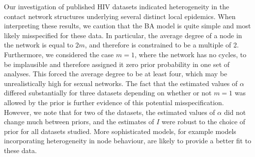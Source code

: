 Our investigation of published HIV datasets indicated heterogeneity in the
contact network structures underlying several distinct local epidemics. When
interpreting these results, we caution that the BA model is quite simple and
most likely misspecified for these data. In particular, the average degree of a
node in the network is equal to $2m$, and therefore is constrained to be a
multiple of 2. Furthermore, we considered the case $m = 1$, where the network
has no cycles, to be implausible and therefore assigned it zero prior
probability in one set of analyses. This forced the average degree to be at
least four, which may be unrealistically high for sexual networks. The fact
that the estimated values of $\alpha$ differed substantially for three datasets
depending on whether or not $m = 1$ was allowed by the prior is further evidence
of this potential misspecification. However, we note that for two of the
datasets, the estimated values of $\alpha$ did not change much between priors,
and the estimates of $I$ were robust to the choice of prior for all datasets
studied. More sophisticated models, for example models incorporating
heterogeneity in node behaviour, are likely to provide a better fit to these
data.

